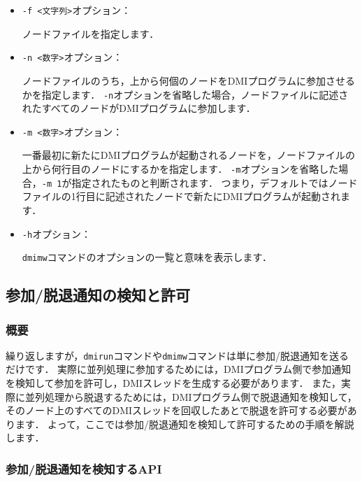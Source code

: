 \documentclass[report,12pt]{jsbook}
\begin{document}
\begin{itemize}
\item \texttt{-f <文字列>}オプション：
  
  ノードファイルを指定します．
\item \texttt{-n <数字>}オプション：
  
  ノードファイルのうち，上から何個のノードをDMIプログラムに参加させるかを指定します．
  \texttt{-n}オプションを省略した場合，ノードファイルに記述されたすべてのノードがDMIプログラムに参加します．
\item \texttt{-m <数字>}オプション：
  
  一番最初に新たにDMIプログラムが起動されるノードを，ノードファイルの上から何行目のノードにするかを指定します．
  \texttt{-m}オプションを省略した場合，\texttt{-m 1}が指定されたものと判断されます．
  つまり，デフォルトではノードファイルの1行目に記述されたノードで新たにDMIプログラムが起動されます．
\item \texttt{-h}オプション：
  
  \texttt{dmimw}コマンドのオプションの一覧と意味を表示します．
\end{itemize}

\subsection{参加/脱退通知の検知と許可}

\subsubsection{概要}

繰り返しますが，\texttt{dmirun}コマンドや\texttt{dmimw}コマンドは単に参加/脱退通知を送るだけです．
実際に並列処理に参加するためには，DMIプログラム側で参加通知を検知して参加を許可し，DMIスレッドを生成する必要があります．
また，実際に並列処理から脱退するためには，DMIプログラム側で脱退通知を検知して，
そのノード上のすべてのDMIスレッドを回収したあとで脱退を許可する必要があります．
よって，ここでは参加/脱退通知を検知して許可するための手順を解説します．

\subsubsection{参加/脱退通知を検知するAPI}
\end{document}
